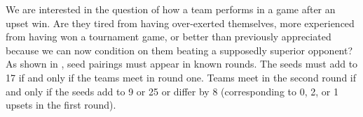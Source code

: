 \documentclass{article}
\begin{document}
We are interested in the question of how a team performs in a game after an upset win.  Are they tired from having over-exerted themselves, more experienced from having won a tournament game, or better than previously appreciated because we can now condition on them beating a supposedly superior opponent?  As %
shown in \cite{Seltzer}, seed pairings must appear in known rounds.
The seeds must add to 17 if and only if the teams meet in round one.  Teams meet in the second round if and only if the seeds add to 9 or 25 or differ by 8 (corresponding to 0, 2, or 1 upsets in the first round).
\end{document}
